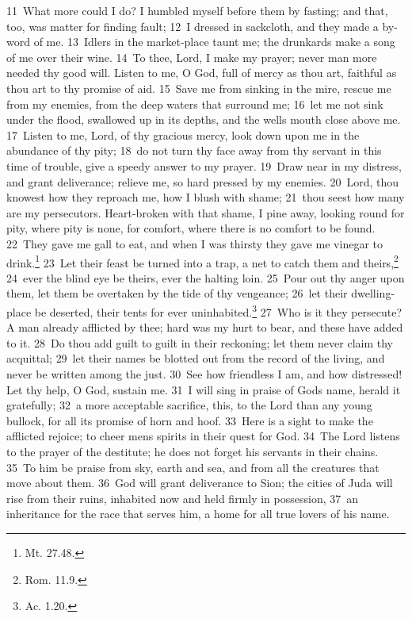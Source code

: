 \documentclass[10pt]{book} %
\begin{document}
\textcolor{benred8}{11}~What more could I do? I humbled myself before them by fasting; and that, too, was matter for finding fault; \textcolor{benred8}{12}~I dressed in sackcloth, and they made a by-word of me. \textcolor{benred8}{13}~Idlers in the market-place taunt me; the drunkards make a song of me over their wine. \textcolor{benred8}{14}~To thee, Lord, I make my prayer; never man more needed thy good will. Listen to me, O God, full of mercy as thou art, faithful as thou art to thy promise of aid. \textcolor{benred8}{15}~Save me from sinking in the mire, rescue me from my enemies, from the deep waters that surround me; \textcolor{benred8}{16}~let me not sink under the flood, swallowed up in its depths, and the well\textquotesingle s mouth close above me. \textcolor{benred8}{17}~Listen to me, Lord, of thy gracious mercy, look down upon me in the abundance of thy pity; \textcolor{benred8}{18}~do not turn thy face away from thy servant in this time of trouble, give a speedy answer to my prayer. \textcolor{benred8}{19}~Draw near in my distress, and grant deliverance; relieve me, so hard pressed by my enemies. \textcolor{benred8}{20}~Lord, thou knowest how they reproach me, how I blush with shame; \textcolor{benred8}{21}~thou seest how many are my persecutors. Heart-broken with that shame, I pine away, looking round for pity, where pity is none, for comfort, where there is no comfort to be found. \textcolor{benred8}{22}~They gave me gall to eat, and when I was thirsty they gave me vinegar to drink.\footnote[1]{Mt. 27.48.} \textcolor{benred8}{23}~Let their feast be turned into a trap, a net to catch them and theirs,\footnote[2]{Rom. 11.9.} \textcolor{benred8}{24}~ever the blind eye be theirs, ever the halting loin. \textcolor{benred8}{25}~Pour out thy anger upon them, let them be overtaken by the tide of thy vengeance; \textcolor{benred8}{26}~let their dwelling-place be deserted, their tents for ever uninhabited.\footnote[3]{Ac. 1.20.} \textcolor{benred8}{27}~Who is it they persecute? A man already afflicted by thee; hard was my hurt to bear, and these have added to it. \textcolor{benred8}{28}~Do thou add guilt to guilt in their reckoning; let them never claim thy acquittal; \textcolor{benred8}{29}~let their names be blotted out from the record of the living, and never be written among the just.
\textcolor{benred8}{30}~See how friendless I am, and how distressed! Let thy help, O God, sustain me. \textcolor{benred8}{31}~I will sing in praise of God\textquotesingle s name, herald it gratefully; \textcolor{benred8}{32}~a more acceptable sacrifice, this, to the Lord than any young bullock, for all its promise of horn and hoof. \textcolor{benred8}{33}~Here is a sight to make the afflicted rejoice; to cheer men\textquotesingle s spirits in their quest for God. \textcolor{benred8}{34}~The Lord listens to the prayer of the destitute; he does not forget his servants in their chains. \textcolor{benred8}{35}~To him be praise from sky, earth and sea, and from all the creatures that move about them. \textcolor{benred8}{36}~God will grant deliverance to Sion; the cities of Juda will rise from their ruins, inhabited now and held firmly in possession, \textcolor{benred8}{37}~an inheritance for the race that serves him, a home for all true lovers of his name.
\end{document}
